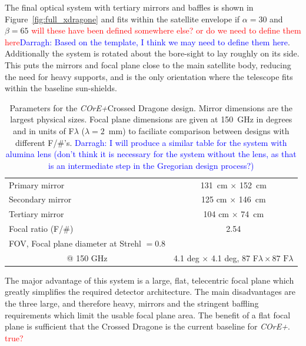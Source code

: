 \documentclass[11pt,a4paper]{article}
\newcommand{\comred}[1]{\textcolor{red}{#1}}
\newcommand{\comblue}[1]{\textcolor{blue}{#1}}
\newcommand{\coreplus}{\textit{\negthinspace COrE+\/}}
\begin{document}
The final optical system with tertiary mirrors and baffles is shown in Figure~\ref{fig:full_xdragone} and fits within 
the satellite envelope if 
$\alpha = 30$ and $\beta = 65$ \comred{will these have been defined somewhere else? or do we need to define them here}\comblue{Darragh: Based on the template, I think we may need to define them here}. 
Additionally the system is rotated about the bore-sight to lay roughly 
on its side.  This puts the mirrors and focal plane close to the main satellite body, reducing the need for 
heavy supports, and is the only orientation where the telescope fits within the baseline sun-shields. 



\begin{table}[h!]
	\centering
	\begin{tabular}{|l|c|}
		\hline
		Primary mirror   & 131~cm $\times$ 152~cm   \\
		Secondary mirror   & 125 cm $\times$ 146~cm  \\
		Tertiary mirror  & 104 cm $\times$ 74~cm    \\
		Focal ratio (F/\#)               & 2.54   \\
		\multicolumn{1}{|l|}{FOV, Focal plane diameter at Strehl $= 0.8$} & \\
		\multicolumn{1}{|c|}{@ 150 GHz}    & 4.1 deg $\times$ 4.1 deg, 87 F$\lambda \times 87 \text{~F}\lambda$ \\
		\hline
		
	\end{tabular}
	\caption{Parameters for the \coreplus Crossed Dragone design.  Mirror dimensions are the largest physical sizes.  Focal 
		plane dimensions are given at 150~GHz in degrees and in units of F$\lambda$ ($\lambda=2$~mm) to faciliate comparison between 
		designs with different F/\#'s.
		\comblue{Darragh: I will produce a similar table for the system with alumina lens (don't think it is necessary for the system without the lens, as that is an intermediate step in the Gregorian design process?)} }
	\label{tab:mirrors}
	
\end{table}

The major advantage of this system is a large, flat, telecentric focal plane which greatly simplifies 
the required detector architecture.  The main disadvantages are the three large, and therefore heavy, 
mirrors and the stringent baffling requirements which limit the usable focal plane area.  The benefit of 
a flat focal plane is sufficient that the Crossed Dragone is the current baseline for \coreplus. \comred{true?}
\end{document}
